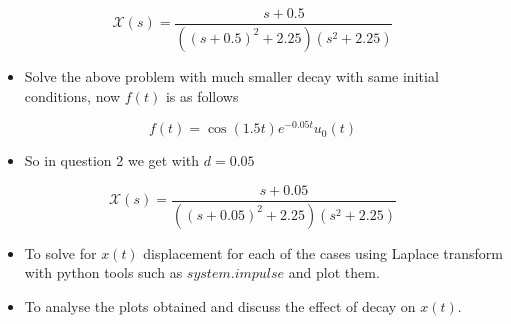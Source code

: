 \documentclass[10pt,a4paper]{article}
\providecommand{\tightlist}{%
      \setlength{\itemsep}{0pt}\setlength{\parskip}{0pt}}
\begin{document}
\begin{equation}
    \mathcal{X}(s) = \frac{s+0.5}{((s+0.5)^2 + 2.25)(s^2 + 2.25)}
\end{equation}

\begin{itemize}
\tightlist
\item
  Solve the above problem with much smaller decay with same initial
  conditions, now \(f(t)\) is as follows
\end{itemize}

\begin{equation}
f(t) = \cos(1.5t) e^{-0.05t}u_0(t)
\end{equation}

\begin{itemize}
\tightlist
\item
  So in question 2 we get with \(d = 0.05\)
\end{itemize}

\begin{equation}
    \mathcal{X}(s) = \frac{s+0.05}{((s+0.05)^2 + 2.25)(s^2 + 2.25)}
\end{equation}

\begin{itemize}
\tightlist
\item
  To solve for \(x(t)\) displacement for each of the cases using Laplace
  transform with python tools such as \(system.impulse\) and plot them.
\item
  To analyse the plots obtained and discuss the effect of decay on
  \(x(t)\).
\end{itemize}
\end{document}
